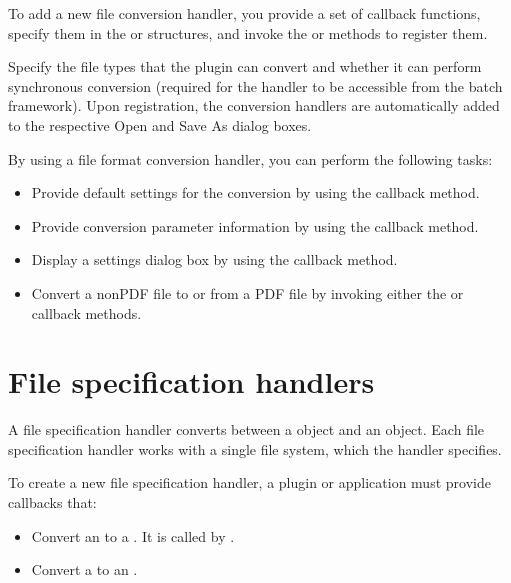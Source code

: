 \documentclass[letterpaper,12pt,english,openany,oneside]{sphinxmanual}
\begin{document}
To add a new file conversion handler, you provide a set of callback functions, specify them in the  or  structures, and invoke the  or  methods to register them.

Specify the file types that the plugin can convert and whether it can perform synchronous conversion (required for the handler to be accessible from the batch framework). Upon registration, the conversion handlers are automatically added to the respective Open and Save As dialog boxes.

By using a file format conversion handler, you can perform the following tasks:
\begin{itemize}
\item {} 
Provide default settings for the conversion by using the  callback method.

\item {} 
Provide conversion parameter information by using the  callback method.

\item {} 
Display a settings dialog box by using the  callback method.

\item {} 
Convert a non\sphinxhyphen{}PDF file to or from a PDF file by invoking either the  or  callback methods.

\end{itemize}


\section{File specification handlers}
\label{\detokenize{Plugins_Handlers:file-specification-handlers}}
A file specification handler converts between a  object and an  object. Each file specification handler works with a single file system, which the handler specifies.

To create a new file specification handler, a plugin or application must provide callbacks that:
\begin{itemize}
\item {} 
Convert an  to a . It is called by .

\item {} 
Convert a  to an .

\end{itemize}
\end{document}
